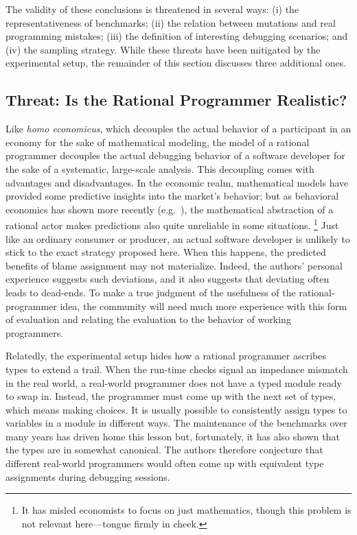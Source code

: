 The validity of these conclusions is threatened in several ways: (i) the
representativeness of benchmarks; (ii) the relation between mutations and real
programming mistakes; (iii) the definition of interesting debugging scenarios;
and (iv) the sampling strategy. While these threats have been mitigated by the
experimental setup, the remainder of this section discusses three additional
ones.

\subsection{Threat: Is the Rational Programmer Realistic?}

Like {\em homo economicus\/}, which decouples the actual behavior of a
participant in an economy for the sake of mathematical modeling, the model of a
rational programmer decouples the actual debugging behavior of a software
developer for the sake of a systematic, large-scale analysis. This decoupling
comes with advantages and disadvantages. In the economic realm, mathematical
models have provided some predictive insights into the market's behavior; but as
behavioral economics has shown more recently (e.g.~\cite{henrich2001search}), the mathematical abstraction of a
rational actor makes predictions also quite unreliable in some situations.
\footnote{It has misled economists to focus on just mathematics, though
this problem is not relevant here---tongue firmly in cheek.}  Just like an
ordinary consumer or producer, an actual software developer is unlikely to stick
to the exact strategy proposed here. When this happens, the predicted benefits
of blame assignment may not materialize. Indeed, the authors' personal
experience suggests such deviations, and it also suggests that deviating often leads to dead-ends.
To make a true judgment of the usefulness of the rational-programmer
idea, the community will need much more experience with this form of evaluation
and relating the evaluation to the behavior of working programmers.

Relatedly, the experimental setup hides how a rational programmer ascribes types
to extend a trail. When the run-time checks signal an impedance mismatch in the
real world, a real-world programmer does not have a typed module ready to swap
in. Instead, the programmer must come up with the next set of types, which means
making choices. It is usually possible to consistently assign types to variables
in a module in different ways. The maintenance of the benchmarks over many years
has driven home this lesson but, fortunately, it has also shown that the types
are in somewhat canonical.  The authors therefore conjecture that different
real-world programmers would often come up with equivalent type assignments
during debugging sessions. 


